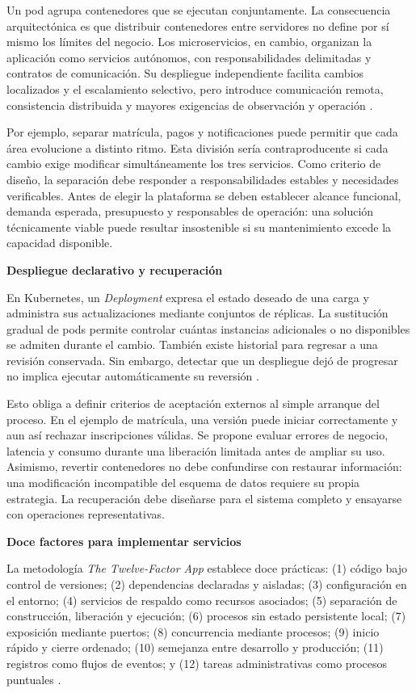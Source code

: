 \documentclass[12pt,letterpaper,onecolumn]{article}
\begin{document}
Un pod agrupa contenedores que se ejecutan conjuntamente. La consecuencia arquitectónica es que distribuir contenedores entre servidores no define por sí mismo los límites del negocio. Los microservicios, en cambio, organizan la aplicación como servicios autónomos, con responsabilidades delimitadas y contratos de comunicación. Su despliegue independiente facilita cambios localizados y el escalamiento selectivo, pero introduce comunicación remota, consistencia distribuida y mayores exigencias de observación y operación \parencite{microsoftMicroservicios}.

Por ejemplo, separar matrícula, pagos y notificaciones puede permitir que cada área evolucione a distinto ritmo. Esta división sería contraproducente si cada cambio exige modificar simultáneamente los tres servicios. Como criterio de diseño, la separación debe responder a responsabilidades estables y necesidades verificables. Antes de elegir la plataforma se deben establecer alcance funcional, demanda esperada, presupuesto y responsables de operación: una solución técnicamente viable puede resultar insostenible si su mantenimiento excede la capacidad disponible.

\textbf{Despliegue declarativo y recuperación}

En Kubernetes, un \textit{Deployment} expresa el estado deseado de una carga y administra sus actualizaciones mediante conjuntos de réplicas. La sustitución gradual de pods permite controlar cuántas instancias adicionales o no disponibles se admiten durante el cambio. También existe historial para regresar a una revisión conservada. Sin embargo, detectar que un despliegue dejó de progresar no implica ejecutar automáticamente su reversión \parencite{kubernetesDeployments}.

Esto obliga a definir criterios de aceptación externos al simple arranque del proceso. En el ejemplo de matrícula, una versión puede iniciar correctamente y aun así rechazar inscripciones válidas. Se propone evaluar errores de negocio, latencia y consumo durante una liberación limitada antes de ampliar su uso. Asimismo, revertir contenedores no debe confundirse con restaurar información: una modificación incompatible del esquema de datos requiere su propia estrategia. La recuperación debe diseñarse para el sistema completo y ensayarse con operaciones representativas.

\textbf{Doce factores para implementar servicios}

La metodología \textit{The Twelve-Factor App} establece doce prácticas: (1) código bajo control de versiones; (2) dependencias declaradas y aisladas; (3) configuración en el entorno; (4) servicios de respaldo como recursos asociados; (5) separación de construcción, liberación y ejecución; (6) procesos sin estado persistente local; (7) exposición mediante puertos; (8) concurrencia mediante procesos; (9) inicio rápido y cierre ordenado; (10) semejanza entre desarrollo y producción; (11) registros como flujos de eventos; y (12) tareas administrativas como procesos puntuales \parencite{wigginsDoce}.
\end{document}
